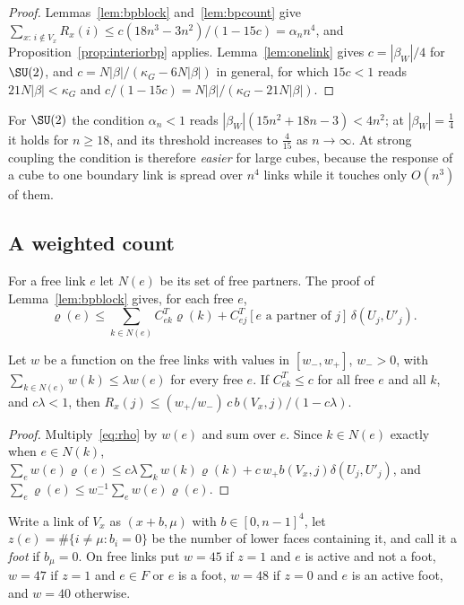 \begin{proof}
Lemmas~\ref{lem:bpblock} and~\ref{lem:bpcount} give $\sum_{x:\,i\notin V_x}
R_x(i)\le c(18n^3-3n^2)/(1-15c)=\alpha_nn^4$, and
Proposition~\ref{prop:interiorbp} applies. Lemma~\ref{lem:onelink} gives
$c=|\beta_W|/4$ for $\SU(2)$, and $c=N|\beta|/(\kappa_G-6N|\beta|)$ in
general, for which $15c<1$ reads $21N|\beta|<\kappa_G$ and $c/(1-15c)=
N|\beta|/(\kappa_G-21N|\beta|)$.
\end{proof}

For $\SU(2)$ the condition $\alpha_n<1$ reads $|\beta_W|(15n^2+18n-3)<4n^2$; at
$|\beta_W|=\frac14$ it holds for $n\ge18$, and its threshold increases to
$\frac4{15}$ as $n\to\infty$. At strong coupling the condition is therefore
\emph{easier} for large cubes, because the response of a cube to one boundary
link is spread over $n^4$ links while it touches only $O(n^3)$ of them.

\subsection*{A weighted count}
For a free link $e$ let $N(e)$ be its set of free partners. The proof of
Lemma~\ref{lem:bpblock} gives, for each free $e$,
\begin{equation}\label{eq:rho}
\varrho(e)\le\sum_{k\in N(e)}C^T_{ek}\varrho(k)+C^T_{ej}[e\text{ a partner of }j]
\,\delta(U_j,U'_j).
\end{equation}

\begin{lemma}\label{lem:weightedresp}
Let $w$ be a function on the free links with values in $[w_-,w_+]$, $w_->0$,
with $\sum_{k\in N(e)}w(k)\le\lambda w(e)$ for every free $e$. If $C^T_{ek}\le
c$ for all free $e$ and all $k$, and $c\lambda<1$, then
$R_x(j)\le(w_+/w_-)\,c\,b(V_x,j)/(1-c\lambda)$.
\end{lemma}

\begin{proof}
Multiply~\eqref{eq:rho} by $w(e)$ and sum over $e$. Since $k\in N(e)$ exactly
when $e\in N(k)$, $\sum_ew(e)\varrho(e)\le c\lambda\sum_kw(k)\varrho(k)+
c\,w_+b(V_x,j)\delta(U_j,U'_j)$, and $\sum_e\varrho(e)\le w_-^{-1}\sum_ew(e)
\varrho(e)$.
\end{proof}

Write a link of $V_x$ as $(x+b,\mu)$ with $b\in[0,n-1]^4$, let
$z(e)=\#\{i\ne\mu:b_i=0\}$ be the number of lower faces containing it, and
call it a \emph{foot} if $b_\mu=0$. On free links put $w=45$ if $z=1$ and $e$
is active and not a foot, $w=47$ if $z=1$ and $e\in F$ or $e$ is a foot,
$w=48$ if $z=0$ and $e$ is an active foot, and $w=40$ otherwise.

